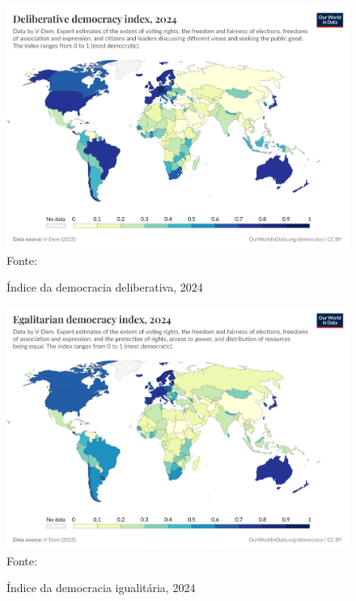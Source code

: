 \begin{figure}[ht]
    \centering
    \caption{Índice da democracia deliberativa, 2024}
    \includegraphics[width=1\linewidth]{figuras/democracia/deliberative-democracy-index-vdem.png}
    \label{fig:deliberative-democracy-index-vdem}
    \footnotesize{Fonte: \cite{deliberative_democracy_index_vdem}}
\end{figure}

\begin{figure}[ht]
    \centering
    \caption{Índice da democracia igualitária, 2024}
    \includegraphics[width=1\linewidth]{figuras/democracia/egalitarian-democracy-index-vdem.png}
    \label{fig:egalitarian-democracy-index-vdem}
    \footnotesize{Fonte: \cite{egalitarian_democracy_index_vdem}}
\end{figure}

